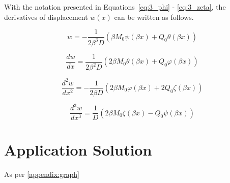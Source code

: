 With the notation presented in Equations~\ref{eq:3_phi} - \ref{eq:3_zeta}, the derivatives of displacement $w(x)$ can be written as follows.

\begin{equation}
	\label{eq:3_w0}
	w = - \frac{1}{2 \beta^3 D} \left( \beta M_0 \psi(\beta x) + Q_0 \theta (\beta x) \right)
\end{equation}

\begin{equation}
	\label{eq:3_w1}
	\frac{dw}{dx} = \frac{1}{2 \beta^2 D} \left( 2 \beta M_0 \theta(\beta x) + Q_0 \varphi(\beta x) \right)	
\end{equation}

\begin{equation}
	\label{eq:3_w2}
	\frac{d^2w}{dx^2} = - \frac{1}{2 \beta D} \left( 2 \beta M_0 \varphi(\beta x) + 2 Q_0 \zeta(\beta x) \right)
\end{equation}

\begin{equation}
	\label{eq:3_w3}
	\frac{d^3w}{dx^3} = \frac{1}{D} \left( 2 \beta M_0 \zeta(\beta x) - Q_0 \psi(\beta x) \right)
\end{equation}


\section{Application Solution}


As per \ref{appendix:graph}